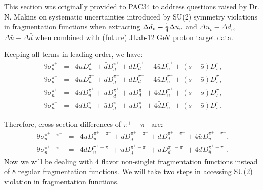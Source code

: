 This section was originally provided to PAC34 to address questions raised by Dr. N. Makins  on systematic uncertainties introduced by 
SU(2) symmetry violations in fragmentation functions 
when extracting  $\Delta d_v - {1 \over 4} \Delta u_v$ and $\Delta u_v - \Delta d_v$, $\Delta \bar{u} - \Delta \bar{d}$
when combined with (future) JLab-12 GeV  proton target data. 


Keeping all terms in leading-order, we have:
\begin{eqnarray}  
 9 \sigma_p^{\pi^+} & = & 4 u D_u^{{\pi}^+} + \bar{d} D_{\bar{d}}^{\pi^+} 
   + d D_d^{\pi^+}+ 4 {\bar u} D_{\bar u}^{\pi^+} + (s+\bar{s}) D_s^{\pi}, \nonumber \\ 
 9 \sigma_p^{\pi^-} & = & 4 u D_u^{{\pi}^-} + \bar{d} D_{\bar{d}}^{\pi^-} 
   + d D_d^{\pi^-}+ 4 {\bar u} D_{\bar u}^{\pi^-} + (s+\bar{s}) D_s^{\pi}, \nonumber \\ 
 9 \sigma_n^{\pi^+} & = & 4 d D_u^{{\pi}^+} + \bar{u} D_{\bar{d}}^{\pi^+} 
   + u D_d^{\pi^+}+ 4 {\bar d} D_{\bar u}^{\pi^+} + (s+\bar{s}) D_s^{\pi}, \nonumber \\ 
 9 \sigma_n^{\pi^-} & = & 4 d D_u^{{\pi}^-} + \bar{u} D_{\bar{d}}^{\pi^-} 
   + u D_d^{\pi^-}+ 4 {\bar d} D_{\bar u}^{\pi^-} + (s+\bar{s}) D_s^{\pi}.
\label{eq:nucleon2}  
\end{eqnarray}  

Therefore, cross section differences of $\pi^+ - \pi^-$ are:
\begin{eqnarray}  
 9 \sigma_p^{\pi^+ -\pi^-} & = & 4 u D_u^{\pi^+ -\pi^-} + \bar{d} D_{\bar{d}}^{\pi^+ -\pi^-} 
   + d D_d^{\pi^+ -\pi^-}+ 4 {\bar u} D_{\bar u}^{\pi^+ -\pi^-}, \nonumber \\ 
 9 \sigma_n^{\pi^+ -\pi^-} & = & 4 d D_u^{\pi^+ -\pi^-} + \bar{u} D_{\bar{d}}^{\pi^+ -\pi^-} 
   + u D_d^{\pi^+ -\pi^-}+ 4 {\bar d} D_{\bar u}^{\pi^+ -\pi^-}. 
\label{eq:nucleon3}  
\end{eqnarray}  
Now we will be dealing with 4 flavor non-singlet fragmentation functions instead of 8 regular fragmentation functions. 
We will take two steps in accessing SU(2) violation in fragmentation functions.

